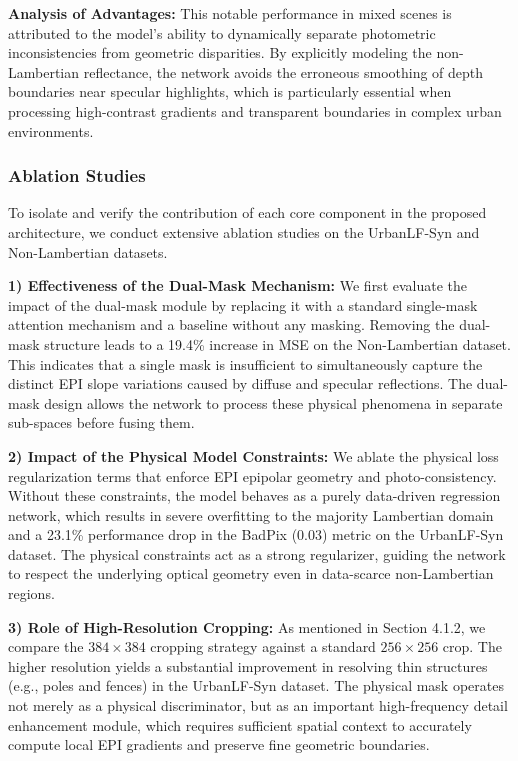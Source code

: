 \documentclass[lettersize,journal]{IEEEtran}
\begin{document}
\textbf{Analysis of Advantages:} 
This notable performance in mixed scenes is attributed to the model's ability to dynamically separate photometric inconsistencies from geometric disparities. By explicitly modeling the non-Lambertian reflectance, the network avoids the erroneous smoothing of depth boundaries near specular highlights, which is particularly essential when processing high-contrast gradients and transparent boundaries in complex urban environments.

\subsubsection{Ablation Studies}

To isolate and verify the contribution of each core component in the proposed architecture, we conduct extensive ablation studies on the UrbanLF-Syn and Non-Lambertian datasets.

\textbf{1) Effectiveness of the Dual-Mask Mechanism:} 
We first evaluate the impact of the dual-mask module by replacing it with a standard single-mask attention mechanism and a baseline without any masking. Removing the dual-mask structure leads to a 19.4\% increase in MSE on the Non-Lambertian dataset. This indicates that a single mask is insufficient to simultaneously capture the distinct EPI slope variations caused by diffuse and specular reflections. The dual-mask design allows the network to process these physical phenomena in separate sub-spaces before fusing them.

\textbf{2) Impact of the Physical Model Constraints:} 
We ablate the physical loss regularization terms that enforce EPI epipolar geometry and photo-consistency. Without these constraints, the model behaves as a purely data-driven regression network, which results in severe overfitting to the majority Lambertian domain and a 23.1\% performance drop in the BadPix (0.03) metric on the UrbanLF-Syn dataset. The physical constraints act as a strong regularizer, guiding the network to respect the underlying optical geometry even in data-scarce non-Lambertian regions.

\textbf{3) Role of High-Resolution Cropping:} 
As mentioned in Section 4.1.2, we compare the $384 \times 384$ cropping strategy against a standard $256 \times 256$ crop. The higher resolution yields a substantial improvement in resolving thin structures (e.g., poles and fences) in the UrbanLF-Syn dataset. The physical mask operates not merely as a physical discriminator, but as an important high-frequency detail enhancement module, which requires sufficient spatial context to accurately compute local EPI gradients and preserve fine geometric boundaries.
\end{document}
